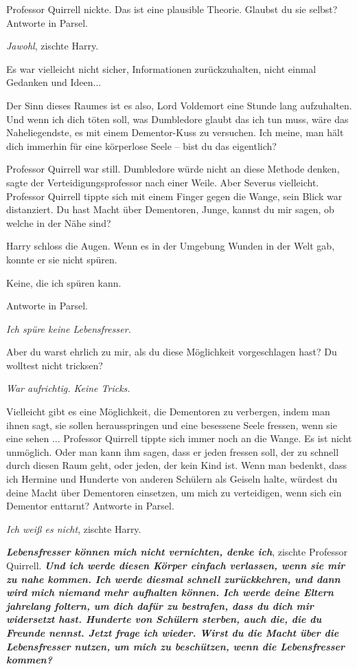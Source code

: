 Professor Quirrell nickte. \glqq{}Das ist eine plausible Theorie. Glaubst du sie
selbst? Antworte in Parsel.\grqq{}

\glqq{}\emph{Jawohl}\grqq{}, zischte Harry.

Es war vielleicht nicht sicher, Informationen zurückzuhalten, nicht einmal
Gedanken und Ideen...

\glqq{}Der Sinn dieses Raumes ist es also, Lord Voldemort eine Stunde lang
aufzuhalten. Und wenn ich dich töten soll, was Dumbledore glaubt das ich tun
muss, wäre das Naheliegendste, es mit einem Dementor-Kuss zu versuchen. Ich
meine, man hält dich immerhin für eine körperlose Seele – bist du das
eigentlich?\grqq{}

Professor Quirrell war still. \glqq{}Dumbledore würde nicht an diese Methode
denken\grqq{}, sagte der Verteidigungsprofessor nach einer Weile. \glqq{}Aber
Severus vielleicht.\grqq{} Professor Quirrell tippte sich mit einem Finger gegen die
Wange, sein Blick war distanziert. \glqq{}Du hast Macht über Dementoren, Junge,
kannst du mir sagen, ob welche in der Nähe sind?\grqq{}

Harry schloss die Augen. Wenn es in der Umgebung Wunden in der Welt gab, konnte
er sie nicht spüren.

\glqq{}Keine, die ich spüren kann.\grqq{}

\glqq{}Antworte in Parsel.\grqq{}

\glqq{}\emph{Ich spüre keine Lebensfresser.}\grqq{}

\glqq{}Aber du warst ehrlich zu mir, als du diese Möglichkeit vorgeschlagen hast?
Du wolltest nicht tricksen?\grqq{}

\glqq{}\emph{War aufrichtig. Keine Tricks.}\grqq{}

\glqq{}Vielleicht gibt es eine Möglichkeit, die Dementoren zu verbergen, indem
man ihnen sagt, sie sollen herausspringen und eine besessene Seele fressen, wenn
sie eine sehen ...\grqq{} Professor Quirrell tippte sich immer noch an die Wange.
\glqq{}Es ist nicht unmöglich. Oder man kann ihm sagen, dass er jeden fressen
soll, der zu schnell durch diesen Raum geht, oder jeden, der kein Kind ist. Wenn
man bedenkt, dass ich Hermine und Hunderte von anderen Schülern als Geiseln
halte, würdest du deine Macht über Dementoren einsetzen, um mich zu verteidigen,
wenn sich ein Dementor enttarnt? Antworte in Parsel.\grqq{}

\glqq{}\emph{Ich weiß es nicht}\grqq{}, zischte Harry.

\glqq{}\textbf{\emph{Lebensfresser können mich nicht vernichten, denke
ich}}\grqq{}, zischte Professor Quirrell. \glqq{}\textbf{\emph{Und ich werde
diesen Körper einfach verlassen, wenn sie mir zu nahe kommen. Ich werde diesmal
schnell zurückkehren, und dann wird mich niemand mehr aufhalten können. Ich
werde deine Eltern jahrelang foltern, um dich dafür zu bestrafen, dass du dich
mir widersetzt hast. Hunderte von Schülern sterben, auch die, die du Freunde
nennst. Jetzt frage ich wieder. Wirst du die Macht über die Lebensfresser
nutzen, um mich zu beschützen, wenn die Lebensfresser kommen?}}\grqq{}

